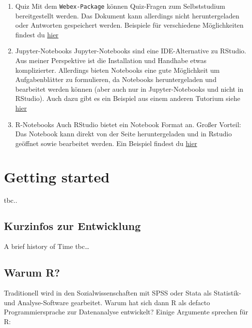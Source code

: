 \documentclass[
]{book}
\begin{document}
\begin{enumerate}
\def\labelenumi{\arabic{enumi}.}
\item
  Quiz
  Mit dem \texttt{Webex-Package} können Quiz-Fragen zum Selbststudium bereitgestellt werden. Das Dokument kann allerdings nicht heruntergeladen oder Antworten gespeichert werden. Beispiele für verschiedene Möglichkeiten findest du \href{https://marcohhu.github.io/data_kurs.github.io/notebooks/sandbox_quiz.html}{hier}
\item
  Jupyter-Notebooks
  Jupyter-Notebooks sind eine IDE-Alternative zu RStudio. Aus meiner Perspektive ist die Installation und Handhabe etwas komplizierter. Allerdings bieten Notebooks eine gute Möglichkeit um Aufgabenblätter zu formulieren, da Notebooks heruntergeladen und bearbeitet werden können (aber auch nur in Jupyter-Notebooks und nicht in RStudio). Auch dazu gibt es ein Beispiel aus einem anderen Tutorium siehe \href{https://marcohhu.github.io/data_kurs.github.io/notebooks/vis.html}{hier}
\item
  R-Notebooks
  Auch RStudio bietet ein Notebook Format an. Großer Vorteil: Das Notebook kann direkt von der Seite heruntergeladen und in Rstudio geöffnet sowie bearbeitet werden. Ein Beispiel findest du \href{https://marcohhu.github.io/data_kurs.github.io/notebooks/sandbox.nb.html}{hier}
\end{enumerate}

\hypertarget{start}{%
\chapter{Getting started}\label{start}}

tbc..

\hypertarget{kurzinfos-zur-entwicklung}{%
\section{Kurzinfos zur Entwicklung}\label{kurzinfos-zur-entwicklung}}

A brief history of Time tbc\ldots{}

\hypertarget{warum-r}{%
\section{Warum R?}\label{warum-r}}

Traditionell wird in den Sozialwissenschaften mit SPSS oder Stata als Statistik- und Analyse-Software gearbeitet. Warum hat sich dann R als defacto Programmiersprache zur Datenanalyse entwickelt? Einige Argumente sprechen für R:
\end{document}
